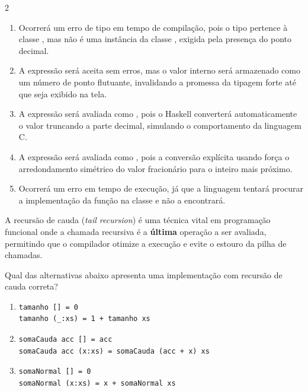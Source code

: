 \documentclass[a4paper,10pt,brazil]{article}
\begin{document}
\begin{multicols}{2}
\begin{enumerate}
  \item Ocorrerá um erro de tipo em tempo de compilação, pois o tipo  pertence à classe , mas não é uma instância da classe , exigida pela presença do ponto decimal.

  \item A expressão será aceita sem erros, mas o valor interno será armazenado como um número de ponto flutuante, invalidando a promessa da tipagem forte até que seja exibido na tela.

  \item A expressão será avaliada como , pois o Haskell converterá automaticamente o valor truncando a parte decimal, simulando o comportamento da linguagem C.

  \item A expressão será avaliada como , pois a conversão explícita usando \haskellinline{::} força o arredondamento simétrico do valor fracionário para o inteiro mais próximo.

  \item Ocorrerá um erro em tempo de execução, já que a linguagem tentará procurar a implementação da função  na classe  e não a encontrará.


\end{enumerate}

A recursão de cauda (\emph{tail recursion}) é uma técnica vital em programação funcional onde a chamada recursiva é a \textbf{última} operação a ser avaliada, permitindo que o compilador otimize a execução e evite o estouro da pilha de chamadas. 

Qual das alternativas abaixo apresenta uma implementação com recursão de cauda correta?

\begin{enumerate}
  \item \begin{verbatim}
tamanho [] = 0
tamanho (_:xs) = 1 + tamanho xs
\end{verbatim}

  \item \begin{verbatim}
somaCauda acc [] = acc
somaCauda acc (x:xs) = somaCauda (acc + x) xs
\end{verbatim}

  \item \begin{verbatim}
somaNormal [] = 0
somaNormal (x:xs) = x + somaNormal xs
\end{verbatim}


\end{enumerate}
\end{multicols}
\end{document}
